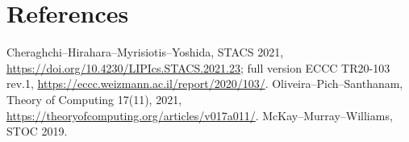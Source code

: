 \documentclass[11pt]{article}
\begin{document}
\section*{References}
Cheraghchi--Hirahara--Myrisiotis--Yoshida, STACS 2021, \url{https://doi.org/10.4230/LIPIcs.STACS.2021.23}; full version ECCC TR20-103 rev.1, \url{https://eccc.weizmann.ac.il/report/2020/103/}. Oliveira--Pich--Santhanam, Theory of Computing 17(11), 2021, \url{https://theoryofcomputing.org/articles/v017a011/}. McKay--Murray--Williams, STOC 2019.
\end{document}
